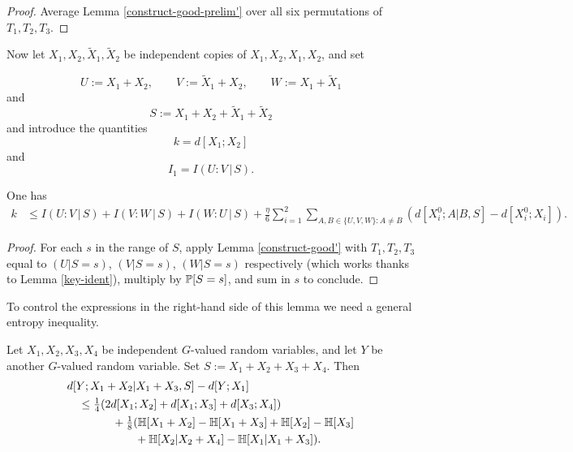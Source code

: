 \begin{proof}
Average Lemma \ref{construct-good-prelim'} over all six permutations of $T_1,T_2,T_3$.
\end{proof}

Now let $X_1, X_2, \tilde X_1, \tilde X_2$ be independent copies of $X_1, X_2, X_1, X_2$, and set

\[U := X_1 + X_2, \qquad V := \tilde X_1 + X_2, \qquad W := X_1 + \tilde X_1\] and
\[  S := X_1 + X_2 + \tilde X_1 + \tilde X_2\]
and introduce the quantities
$$ k = d[X_1;X_2]$$
and
$$ I_1 = I(U : V \, | \, S).$$

\begin{lemma}\label{averaged-construct-good}
  One has
  \begin{align*}  k & \leq I(U : V \, | \, S) + I(V : W \, | \,S) + I(W : U \, | \, S) + \frac{\eta}{6}  \sum_{i=1}^2 \sum_{A,B \in \{U,V,W\}: A \neq B} (d[X^0_i;A|B,S] - d[X^0_i; X_i]).
    \end{align*}
\end{lemma}

\begin{proof}  For each $s$ in the range of $S$, apply Lemma \ref{construct-good'} with $T_1,T_2,T_3$ equal to $(U|S=s)$, $(V|S=s)$, $(W|S=s)$ respectively (which works thanks to Lemma \ref{key-ident}), multiply by $\mathbb{P}[S=s]$, and sum in $s$ to conclude.
\end{proof}

To control the expressions in the right-hand side of this lemma we need a general entropy inequality.

\begin{lemma}\label{gen-ineq}  Let $X_1, X_2, X_3, X_4$ be independent $G$-valued random variables, and let $Y$ be another $G$-valued random variable.  Set $S := X_1+X_2+X_3+X_4$. Then
  \begin{align*}
    &  d[Y; X_1+X_2|X_1 + X_3, S] - d[Y; X_1] \\
    &\quad \leq \tfrac{1}{4} (2d[X_1;X_2] + d[X_1;X_3] + d[X_3;X_4])\\
    &\qquad \qquad + \tfrac{1}{8} (\mathbb{H}[X_1+X_2] - \mathbb{H}[X_1+X_3] + \mathbb{H}[X_2] - \mathbb{H}[X_3]\\
    &\qquad \qquad \qquad + \mathbb{H}[X_2|X_2+X_4] - \mathbb{H}[X_1|X_1+X_3]).
\end{align*}
\end{lemma}

